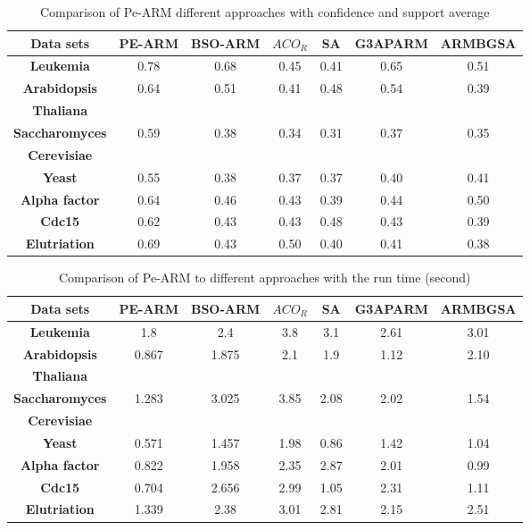 \documentclass[preprint,12pt]{elsarticle}
\begin{document}
\begin{table}[htbp]
\small
\centering
\label{Fig6}
\caption{Comparison of Pe-ARM different approaches with confidence and support average }
\begin{tabular}{c c c c c c c}
\toprule
\textbf{Data sets} &  PE-ARM& BSO-ARM & $ACO_{R}$ & SA & G3APARM & ARMBGSA\\
\toprule
\textbf{Leukemia}                &	0.78 &	0.68& 0.45 & 0.41	& 0.65 & 0.51	\\\hline
\textbf{Arabidopsis }  &  \multirow{2}{*}{0.64} &  \multirow{2}{*}{0.51}& \multirow{2}{*}{0.41} & \multirow{2}{*}{0.48} & \multirow{2}{*}{0.54} & \multirow{2}{*}{0.39} \\
\textbf{Thaliana} &   & &	 &  &  & \\\hline
\textbf{Saccharomyces}& \multirow{2}{*}{ 0.59 }& \multirow{2}{*}{ 0.38}&	\multirow{2}{*}{0.34} & \multirow{2}{*}{0.31} & \multirow{2}{*}{0.37} & \multirow{2}{*}{0.35}	\\
\textbf{Cerevisiae} &   & &	 &  &  & \\\hline
\textbf{Yeast}                   &	0.55 &	0.38& 0.37 & 0.37 & 0.40 & 0.41 \\\hline
\textbf{Alpha factor}            &	0.64 &	0.46&	0.43 & 0.39	& 0.44 & 0.50	\\\hline
\textbf{Cdc15}                   &	0.62 &	0.43& 0.43 & 0.48 & 0.43 & 0.39	\\\hline
\textbf{Elutriation}             &	0.69 &	0.43&	0.50 & 0.40 & 0.41 & 0.38	\\\hline
\bottomrule
\end{tabular}
\end{table}
\begin{table}[htbp]
\small
\centering
\caption{Comparison of Pe-ARM to different approaches with the run time (second)}
\begin{tabular}{c c c c c c c}
\toprule
\textbf{Data sets} & PE-ARM& BSO-ARM & $ACO_{R}$ & SA & G3APARM & ARMBGSA \\
\midrule
\textbf{Leukemia}                &1.8  &2.4  & 3.8  & 3.1 & 2.61 & 3.01\\\hline
\textbf{Arabidopsis}  & \multirow{2}{*}{0.867}& \multirow{2}{*}{1.875}&  \multirow{2}{*}{2.1}  &  \multirow{2}{*}{1.9} &  \multirow{2}{*}{1.12} &  \multirow{2}{*}{2.10}\\
\textbf{Thaliana} &   & &	 &  &  & \\\hline
\textbf{Saccharomyces}&\multirow{2}{*}{1.283}&\multirow{2}{*}{3.025}&\multirow{2}{*}{ 3.85} & \multirow{2}{*}{2.08}&\multirow{2}{*}{ 2.02} &\multirow{2}{*}{ 1.54}\\
\textbf{Cerevisiae} &   & &	 &  &  & \\\hline
\textbf{Yeast}                   &0.571&1.457& 1.98 & 0.86& 1.42 & 1.04\\\hline
\textbf{Alpha factor}            &0.822&1.958& 2.35 & 2.87& 2.01 & 0.99\\\hline
\textbf{Cdc15}                   &0.704&2.656& 2.99 & 1.05& 2.31 & 1.11\\\hline
\textbf{Elutriation}             &1.339&2.38 & 3.01 & 2.81& 2.15 & 2.51\\\hline
\bottomrule
\end{tabular}
\end{table}
\end{document}
